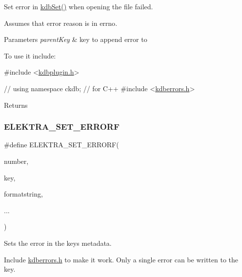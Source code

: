 Set error in \hyperlink{group__kdb_ga11436b058408f83d303ca5e996832bcf}{kdb\+Set()} when opening the file failed. 

Assumes that error reason is in {\ttfamily errno}.


\begin{DoxyParams}{Parameters}
{\em parent\+Key} & key to append error to\\
\hline
\end{DoxyParams}
To use it include\+:


\begin{DoxyCodeInclude}
\textcolor{preprocessor}{#include <\hyperlink{kdbplugin_8h}{kdbplugin.h}>}
\end{DoxyCodeInclude}

\begin{DoxyCodeInclude}
\textcolor{comment}{// using namespace ckdb; // for C++}
\textcolor{preprocessor}{#include <\hyperlink{kdberrors_8h}{kdberrors.h}>}
\end{DoxyCodeInclude}
 \begin{DoxyReturn}{Returns}

\end{DoxyReturn}
\mbox{\label{group__plugin_ga3e4fc2c20d8e64bed7a54bb1af882e34}} 
\subsubsection{\texorpdfstring{E\+L\+E\+K\+T\+R\+A\+\_\+\+S\+E\+T\+\_\+\+E\+R\+R\+O\+RF}{ELEKTRA\_SET\_ERRORF}}
{\footnotesize\ttfamily \#define E\+L\+E\+K\+T\+R\+A\+\_\+\+S\+E\+T\+\_\+\+E\+R\+R\+O\+RF(\begin{DoxyParamCaption}\item[{}]{number,  }\item[{}]{key,  }\item[{}]{formatstring,  }\item[{}]{... }\end{DoxyParamCaption})}



Sets the error in the keys metadata. 

Include \hyperlink{kdberrors_8h}{kdberrors.\+h} to make it work. Only a single error can be written to the key.


